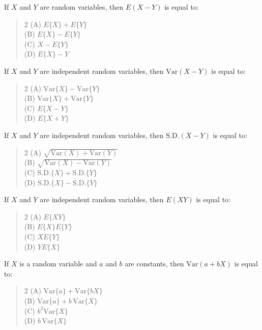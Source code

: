 \documentclass[11pt,a4paper]{article}
\begin{document}
\begin{mcqlist}
\item If $X$ and $Y$ are random variables, then $E(X-Y)$ is equal to:
\begin{quote}\begin{multicols}{2}
\noindent (A) $E\{X\}+E\{Y\}$ \\
(B) $E\{X\}-E\{Y\}$ \\
(C) $X-E\{Y\}$ \\
(D) $E\{X\}-Y$
\end{multicols}\end{quote}

\item If $X$ and $Y$ are independent random variables, then $\mathrm{Var}(X-Y)$ is equal to:
\begin{quote}\begin{multicols}{2}
\noindent (A) $\mathrm{Var}\{X\}-\mathrm{Var}\{Y\}$ \\
(B) $\mathrm{Var}\{X\}+\mathrm{Var}\{Y\}$ \\
(C) $E\{X-Y\}$ \\
(D) $E\{X+Y\}$
\end{multicols}\end{quote}

\item If $X$ and $Y$ are independent random variables, then $\mathrm{S.D.}(X-Y)$ is equal to:
\begin{quote}\begin{multicols}{2}
\noindent (A) $\sqrt{\mathrm{Var}(X)+\mathrm{Var}(Y)}$ \\
(B) $\sqrt{\mathrm{Var}(X)-\mathrm{Var}(Y)}$ \\
(C) $\mathrm{S.D.}\{X\}+\mathrm{S.D.}\{Y\}$ \\
(D) $\mathrm{S.D.}\{X\}-\mathrm{S.D.}\{Y\}$
\end{multicols}\end{quote}

\item If $X$ and $Y$ are independent random variables, then $E(XY)$ is equal to:
\begin{quote}\begin{multicols}{2}
\noindent (A) $E\{XY\}$ \\
(B) $E\{X\}E\{Y\}$ \\
(C) $XE\{Y\}$ \\
(D) $YE\{X\}$
\end{multicols}\end{quote}

\item If $X$ is a random variable and $a$ and $b$ are constants, then $\mathrm{Var}(a+bX)$ is equal to:
\begin{quote}\begin{multicols}{2}
\noindent (A) $\mathrm{Var}\{a\}+\mathrm{Var}\{bX\}$ \\
(B) $\mathrm{Var}\{a\}+b\,\mathrm{Var}\{X\}$ \\
(C) $b^2\mathrm{Var}\{X\}$ \\
(D) $b\,\mathrm{Var}\{X\}$
\end{multicols}\end{quote}


\end{mcqlist}
\end{document}
